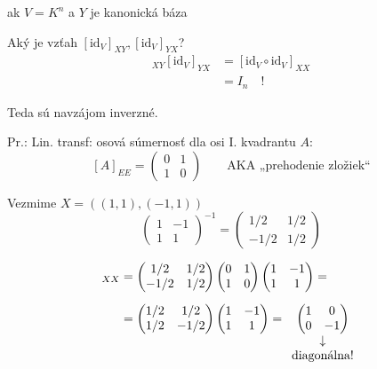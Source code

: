 \documentclass[11pt,a4paper]{article}
\theoremstyle{definition}
\theoremstyle{plain}
\theoremstyle{remark}
\newcommand{\id}{\mathrm{id}}
\newcommand{\ora}[1]{\overrightarrow{#1}}
\begin{document}
ak $V = K^n$ a $Y$ je kanonická báza
\begin{center}
\end{center}

\vspace{0.3cm}
\noindent Aký je vzťah $[\id_V]_{XY}, [\id_V]_{YX}$?
\begin{align*}
[\id_V]_{XY} [\id_V]_{YX} &= [\id_V \circ \id_V]_{XX} \\
&= I_n \quad \textbf{!}
\end{align*}

Teda sú navzájom inverzné.

Pr.: Lin. transf: osová súmernosť dla osi I. kvadrantu $A$:
\[
[A]_{EE} = \begin{pmatrix} 0 & 1 \\ 1 & 0 \end{pmatrix} \qquad \text{AKA „prehodenie zložiek“}
\]

Vezmime $X = ((1,1), (-1,1))$
\[
\begin{pmatrix} 1 & -1 \\ 1 & 1 \end{pmatrix}^{-1} = \begin{pmatrix} 1/2 & 1/2 \\ -1/2 & 1/2 \end{pmatrix}
\]

\begin{align*}
[A]_{XX} &= \begin{pmatrix} 1/2 & 1/2 \\ -1/2 & 1/2 \end{pmatrix} 
\begin{pmatrix} 0 & 1 \\ 1 & 0 \end{pmatrix} 
\begin{pmatrix} 1 & -1 \\ 1 & 1 \end{pmatrix} = \\[0.2cm]
&= \begin{pmatrix} 1/2 & 1/2 \\ 1/2 & -1/2 \end{pmatrix} 
\begin{pmatrix} 1 & -1 \\ 1 & 1 \end{pmatrix} = 
\begin{array}[t]{c}
\begin{pmatrix} 1 & 0 \\ 0 & -1 \end{pmatrix} \\
\downarrow \\
\text{diagonálna!}
\end{array}
\end{align*}
\end{document}
